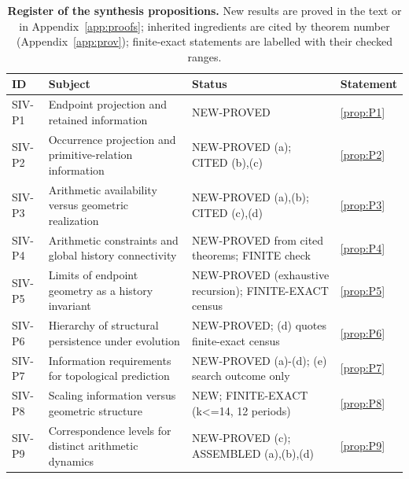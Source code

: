 \begin{table}[t]\centering\footnotesize\setlength{\tabcolsep}{3pt}\begin{tabular}{@{}p{1.3cm}p{4.6cm}p{4.6cm}p{2.5cm}@{}}\toprule
ID & Subject & Status & Statement \\\midrule
SIV-P1 & Endpoint projection and retained information & NEW-PROVED & \cref{prop:P1}\\
SIV-P2 & Occurrence projection and primitive-relation information & NEW-PROVED (a); CITED (b),(c) & \cref{prop:P2}\\
SIV-P3 & Arithmetic availability versus geometric realization & NEW-PROVED (a),(b); CITED (c),(d) & \cref{prop:P3}\\
SIV-P4 & Arithmetic constraints and global history connectivity & NEW-PROVED from cited theorems; FINITE check & \cref{prop:P4}\\
SIV-P5 & Limits of endpoint geometry as a history invariant & NEW-PROVED (exhaustive recursion); FINITE-EXACT census & \cref{prop:P5}\\
SIV-P6 & Hierarchy of structural persistence under evolution & NEW-PROVED; (d) quotes finite-exact census & \cref{prop:P6}\\
SIV-P7 & Information requirements for topological prediction & NEW-PROVED (a)-(d); (e) search outcome only & \cref{prop:P7}\\
SIV-P8 & Scaling information versus geometric structure & NEW; FINITE-EXACT (k<=14, 12 periods) & \cref{prop:P8}\\
SIV-P9 & Correspondence levels for distinct arithmetic dynamics & NEW-PROVED (c); ASSEMBLED (a),(b),(d) & \cref{prop:P9}\\
\bottomrule\end{tabular}\caption{\textbf{Register of the synthesis propositions.} New results are proved in the text or in Appendix~\ref{app:proofs}; inherited ingredients are cited by theorem number (Appendix~\ref{app:prov}); finite-exact statements are labelled with their checked ranges.}\label{tab:register}\end{table}
